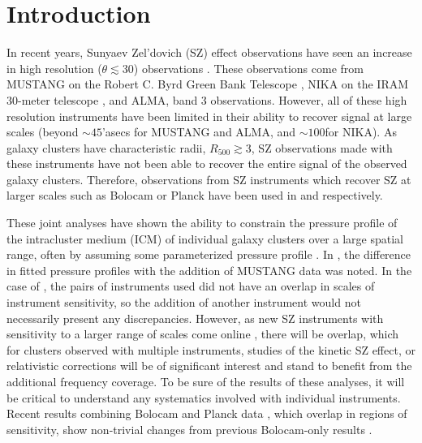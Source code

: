 \documentclass[twocolumn,traditabstract]{aa}
\begin{document}
\section{Introduction}
\label{sec:intro}


In recent years, Sunyaev Zel'dovich (SZ) effect observations have seen an increase in high resolution ($\theta \lesssim 30$\asecs)
observations \citep[e.g.][]{mason2010,adam2014,kitayama2016}. These observations come from MUSTANG on the
Robert C. Byrd Green Bank Telescope \citep[GBT][]{dicker2008}, NIKA on the IRAM 30-meter telescope \citep{monfardini2010},
and ALMA, band 3 observations. However, all of these high resolution instruments have been limited in their ability to
recover signal at large scales (beyond $\sim 45$'asecs for MUSTANG and ALMA, and $\sim 100$\asecs for NIKA). As galaxy clusters
have characteristic radii, $R_{500} \gtrsim 3$\amin, SZ observations made with these instruments have not been able to recover the
entire signal of the observed galaxy clusters. Therefore, observations from SZ instruments which recover SZ at larger scales
such as Bolocam \citet{czakon2015} or Planck \citep{planck2013a} have been used in \citet{romero2015a} and \citet{adam2014} respectively.

These joint analyses have shown the ability to constrain the pressure profile of the intracluster medium (ICM) of individual
galaxy clusters over a large spatial range, often by assuming some parameterized pressure profile \citep[e.g.][]{romero2016,adam2014}.
In \citet{romero2015a}, the difference in fitted pressure profiles with the addition of MUSTANG data was noted. In the case of
\citet{romero2016,adam2014}, the pairs of instruments used did not have an overlap in scales of instrument sensitivity, so the
addition of another instrument would not necessarily present any discrepancies. However, as new SZ instruments with sensitivity to
a larger range of scales come online \citep{monfardini2014,dicker2014a}, there will be overlap, which for clusters observed with
multiple instruments, studies of the kinetic SZ effect, or relativistic corrections \citep{itoh1998} will be of significant interest and
stand to benefit from the additional frequency coverage. To be sure of the results of these analyses, it will be critical to
understand any systematics involved with individual instruments. Recent results combining Bolocam and Planck data \citep{sayers2016},
which overlap in regions of sensitivity, show non-trivial changes from previous Bolocam-only results \citep{sayers2013}.
\end{document}
